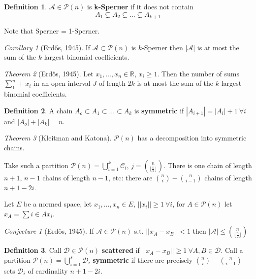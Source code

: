 \documentclass[a4paper]{article}
\theoremstyle{definition}
\newtheorem*{definition}{Definition}
\theoremstyle{remark}
\theoremstyle{default}
\newtheorem*{conjecture}{Conjecture}
\newtheorem{theorem}{Theorem}
\newtheorem{corollary}[theorem]{Corollary}
\newcommand*\abs[1]{\left|#1\right|}
\newcommand*\norm[1]{\abs{\abs{#1}}}
\begin{document}
\begin{definition}
	$\mathcal{A} \in \mathcal{P}(n)$ is \textbf{k-Sperner} if it does not contain $$A_1 \subsetneq A_2 \subsetneq \dots \subsetneq A_{k+1}$$
\end{definition}

Note that Sperner = 1-Sperner.

\begin{corollary}[Erd\H{o}s, 1945]
If $\mathcal{A} \subset \mathcal{P}(n)$ is $k$-Sperner then $\abs{\mathcal{A}}$ is at most the sum of the $k$ largest binomial coefficients.	
\end{corollary}

\begin{theorem}[Erd\H{o}s, 1945]
	Let $x_1, \dots, x_n \in \mathbb{R}$, $x_i \geq 1$.
	Then the number of sums $\sum_1^n \pm x_i$ in an open interval $J$ of length $2k$ is at most the sum of the $k$ largest binomial coefficients.
\end{theorem}

\begin{definition}
	A chain $A_o \subset A_1 \subset \dots \subset A_k$ is \textbf{symmetric} if $\abs{A_{i+1}} = \abs{A_i} + 1\ \forall i$ and $\abs{A_o} + \abs{A_k} = n$.
\end{definition}

\begin{theorem}[Kleitman and Katona]
	$\mathcal{P}(n)$ has a decomposition into symmetric chains.
\end{theorem}

Take such a partition $\mathcal{P}(n) = \bigcup_{i=1}^k \mathcal{C}_i$, $j = {n \choose {\lfloor\frac{n}{2}\rfloor}}$.
There is one chain of length $n+1$, $n-1$ chains of length $n-1$, etc:
there are ${n \choose i} - {n \choose {i-1}}$ chains of length $n+1-2i$.

Let $E$ be a normed space, let $x_1, \dots, x_n \in E$, $\norm{x_i} \geq 1 \ \forall i$, for $A \in \mathcal{P}(n)$ let $x_A = \sum{i \in A} x_i$.
\begin{conjecture}[Erd\H{o}s, 1945]
	If $\mathcal{A} \in \mathcal{P}(n)$ s.t. $\norm{x_A - x_B} < 1$ then $\abs{\mathcal{A}} \leq {n \choose {\lfloor\frac{n}{2}\rfloor}}$
\end{conjecture}

\begin{definition}
	Call $\mathcal{D} \in \mathcal{P}(n)$ \textbf{scattered} if $\norm{x_A - x_B} \geq 1 \ \forall A,B \in \mathcal{D}$.
	Call a partition $\mathcal{P}(n) = \bigcup_{i=1}^s \mathcal{D}_i$ \textbf{symmetric}
	if there are precisely ${n \choose i} - {n \choose i-1}$ sets $\mathcal{D}_i$ of cardinality $n+1-2i$.
\end{definition}
\end{document}

